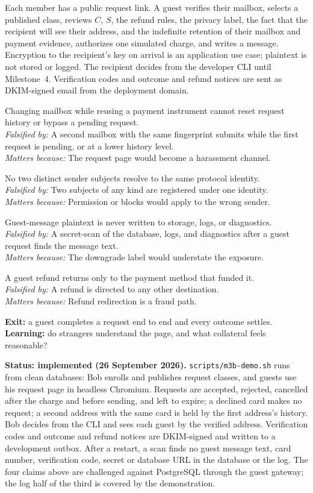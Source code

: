 \documentclass[11pt]{article}
\newenvironment{claims}{\begin{description}[leftmargin=1em,style=nextline,itemsep=0.4em]}{\end{description}}
\newcommand{\claim}[4]{\Needspace{6\baselineskip}\item[Claim (#1).] #2\\
    \textit{Falsified by:} #3\\
    \textit{Matters because:} #4}
\begin{document}
Each member has a public request link. A guest verifies their mailbox, selects a
published class, reviews $C$, $S$, the refund rules, the privacy label, the
fact that the recipient will see their address, and the indefinite retention of
their mailbox and payment evidence, authorizes one simulated charge,
and writes a message. Encryption to the recipient's key on arrival is an
application use case; plaintext is not stored or logged. The recipient decides
from the developer CLI until Milestone~4. Verification codes and outcome and
refund notices are sent as DKIM-signed email from the deployment domain.

\begin{claims}
\claim{PostgreSQL}{Changing mailbox while reusing a payment instrument cannot reset request history or bypass a pending request.}
    {A second mailbox with the same fingerprint submits while the first request is pending, or at a lower history level.}
    {The request page would become a harassment channel.}
\claim{PostgreSQL}{No two distinct sender subjects resolve to the same protocol identity.}
    {Two subjects of any kind are registered under one identity.}
    {Permission or blocks would apply to the wrong sender.}
\claim{inspection and integration}{Guest-message plaintext is never written to storage, logs, or diagnostics.}
    {A secret-scan of the database, logs, and diagnostics after a guest request finds the message text.}
    {The downgrade label would understate the exposure.}
\claim{PostgreSQL}{A guest refund returns only to the payment method that funded it.}
    {A refund is directed to any other destination.}
    {Refund redirection is a fraud path.}
\end{claims}

\textbf{Exit:} a guest completes a request end to end and every outcome settles.
\textbf{Learning:} do strangers understand the page, and what collateral feels
reasonable?

\textbf{Status: implemented (26 September 2026).} \texttt{scripts/m3b-demo.sh} runs
from clean databases: Bob enrolls and publishes request classes, and guests use his
request page in headless Chromium. Requests are accepted, rejected, cancelled after
the charge and before sending, and left to expire; a declined card makes no request;
a second address with the same card is held by the first address's history. Bob
decides from the CLI and sees each guest by the verified address. Verification codes
and outcome and refund notices are DKIM-signed and written to a development outbox.
After a restart, a scan finds no guest message text, card number, verification code,
secret or database URL in the database or the log. The four claims above are
challenged against PostgreSQL through the guest gateway; the log half of the third is
covered by the demonstration.
\end{document}
